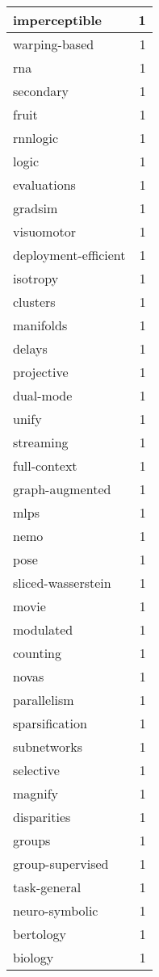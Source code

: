 \begin{table}[h]
\begin{tabular}{|l|r|}
\hline
imperceptible & 1 \\
\hline
warping-based & 1 \\
\hline
rna & 1 \\
\hline
secondary & 1 \\
\hline
fruit & 1 \\
\hline
rnnlogic & 1 \\
\hline
logic & 1 \\
\hline
evaluations & 1 \\
\hline
gradsim & 1 \\
\hline
visuomotor & 1 \\
\hline
deployment-efficient & 1 \\
\hline
isotropy & 1 \\
\hline
clusters & 1 \\
\hline
manifolds & 1 \\
\hline
delays & 1 \\
\hline
projective & 1 \\
\hline
dual-mode & 1 \\
\hline
unify & 1 \\
\hline
streaming & 1 \\
\hline
full-context & 1 \\
\hline
graph-augmented & 1 \\
\hline
mlps & 1 \\
\hline
nemo & 1 \\
\hline
pose & 1 \\
\hline
sliced-wasserstein & 1 \\
\hline
movie & 1 \\
\hline
modulated & 1 \\
\hline
counting & 1 \\
\hline
novas & 1 \\
\hline
parallelism & 1 \\
\hline
sparsification & 1 \\
\hline
subnetworks & 1 \\
\hline
selective & 1 \\
\hline
magnify & 1 \\
\hline
disparities & 1 \\
\hline
groups & 1 \\
\hline
group-supervised & 1 \\
\hline
task-general & 1 \\
\hline
neuro-symbolic & 1 \\
\hline
bertology & 1 \\
\hline
biology & 1 \\

\end{tabular}
\end{table}
